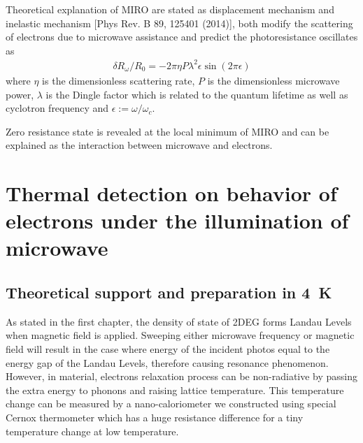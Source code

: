 \documentclass[12pt]{ruthesis}
\begin{document}
Theoretical explanation of MIRO are stated as displacement mechanism and inelastic mechanism [Phys Rev. B 89, 125401 (2014)], both modify the scattering of electrons due to microwave assistance and predict the photoresistance oscillates as 
\begin{align}
\delta R_{\omega}/R_{0} =-2\pi\eta P\lambda^{2}\epsilon \sin(2\pi\epsilon)
\end{align} 
where $\eta$ is the dimensionless scattering rate, $P$ is the dimensionless microwave power, $\lambda$ is the Dingle factor which is related to the quantum lifetime as well as cyclotron frequency and $\epsilon :=\omega/\omega_{c}$. 

Zero resistance state is revealed at the local minimum of MIRO and can be explained as the interaction between microwave and electrons.





\chapter{Thermal detection on behavior of electrons under the illumination of microwave}\label{Thermal}





\section{Theoretical support and preparation in \SI{4}{K}}\label{Theoretical}

As stated in the first chapter, the density of state of 2DEG forms Landau Levels when magnetic field is applied.
Sweeping either microwave frequency or magnetic field will result in the case where energy of the incident photos equal to the energy gap of the Landau Levels, therefore causing resonance phenomenon.
However, in  material, electrons relaxation process can be non-radiative by passing the extra energy to phonons and raising lattice temperature.
This temperature change can be measured by a nano-caloriometer we constructed using special Cernox thermometer which has a huge resistance difference for a tiny temperature change at low temperature.  
\end{document}
